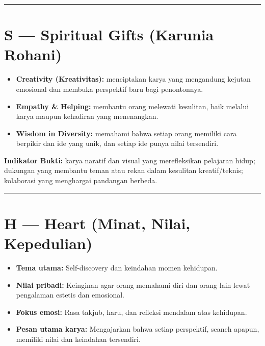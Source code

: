 \documentclass[
  letterpaper,
  DIV=11,
  numbers=noendperiod]{scrreprt}
\providecommand{\tightlist}{%
  \setlength{\itemsep}{0pt}\setlength{\parskip}{0pt}}
\begin{document}
\begin{center}\rule{0.5\linewidth}{0.5pt}\end{center}

\section{S --- Spiritual Gifts (Karunia
Rohani)}\label{s-spiritual-gifts-karunia-rohani}

\begin{itemize}
\tightlist
\item
  \textbf{Creativity (Kreativitas):} menciptakan karya yang mengandung
  kejutan emosional dan membuka perspektif baru bagi penontonnya.\\
\item
  \textbf{Empathy \& Helping:} membantu orang melewati kesulitan, baik
  melalui karya maupun kehadiran yang menenangkan.\\
\item
  \textbf{Wisdom in Diversity:} memahami bahwa setiap orang memiliki
  cara berpikir dan ide yang unik, dan setiap ide punya nilai
  tersendiri.
\end{itemize}

\textbf{Indikator Bukti:} karya naratif dan visual yang merefleksikan
pelajaran hidup; dukungan yang membantu teman atau rekan dalam kesulitan
kreatif/teknis; kolaborasi yang menghargai pandangan berbeda.

\begin{center}\rule{0.5\linewidth}{0.5pt}\end{center}

\section{H --- Heart (Minat, Nilai,
Kepedulian)}\label{h-heart-minat-nilai-kepedulian}

\begin{itemize}
\tightlist
\item
  \textbf{Tema utama:} Self-discovery dan keindahan momen kehidupan.\\
\item
  \textbf{Nilai pribadi:} Keinginan agar orang memahami diri dan orang
  lain lewat pengalaman estetis dan emosional.\\
\item
  \textbf{Fokus emosi:} Rasa takjub, haru, dan refleksi mendalam atas
  kehidupan.\\
\item
  \textbf{Pesan utama karya:} Mengajarkan bahwa setiap perspektif,
  seaneh apapun, memiliki nilai dan keindahan tersendiri.
\end{itemize}
\end{document}
